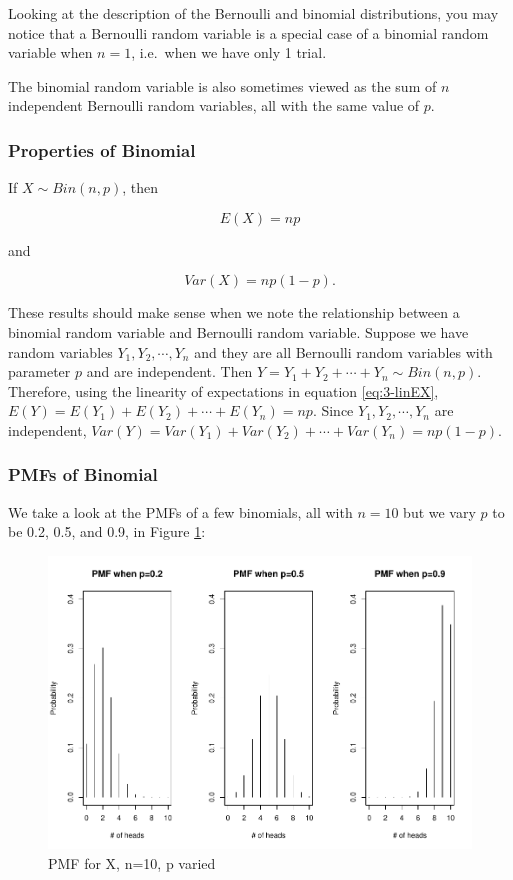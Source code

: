 \documentclass[
]{book}
\begin{document}
Looking at the description of the Bernoulli and binomial distributions, you may notice that a Bernoulli random variable is a special case of a binomial random variable when \(n=1\), i.e.~when we have only 1 trial.

The binomial random variable is also sometimes viewed as the sum of \(n\) independent Bernoulli random variables, all with the same value of \(p\).

\subsubsection{Properties of Binomial}\label{properties-of-binomial}

If \(X \sim Bin(n,p)\), then

\begin{equation} 
E(X) = np
\label{eq:3-bin-EX}
\end{equation}

and

\begin{equation} 
Var(X) = np(1-p).
\label{eq:3-bin-var}
\end{equation}

These results should make sense when we note the relationship between a binomial random variable and Bernoulli random variable. Suppose we have random variables \(Y_1, Y_2, \cdots, Y_n\) and they are all Bernoulli random variables with parameter \(p\) and are independent. Then \(Y = Y_1 + Y_2 + \cdots + Y_n \sim Bin(n,p)\). Therefore, using the linearity of expectations in equation \eqref{eq:3-linEX}, \(E(Y) = E(Y_1) + E(Y_2) + \cdots + E(Y_n) = np\). Since \(Y_1, Y_2, \cdots, Y_n\) are independent, \(Var(Y) = Var(Y_1) + Var(Y_2) + \cdots + Var(Y_n) = np(1-p)\).

\subsubsection{PMFs of Binomial}\label{pmfs-of-binomial}

We take a look at the PMFs of a few binomials, all with \(n=10\) but we vary \(p\) to be 0.2, 0.5, and 0.9, in Figure \ref{fig:3-pmfs}:

\begin{figure}
\centering
\includegraphics{bookdown-demo_files/figure-latex/3-pmfs-1.pdf}
\caption{\label{fig:3-pmfs}PMF for X, n=10, p varied}
\end{figure}
\end{document}
